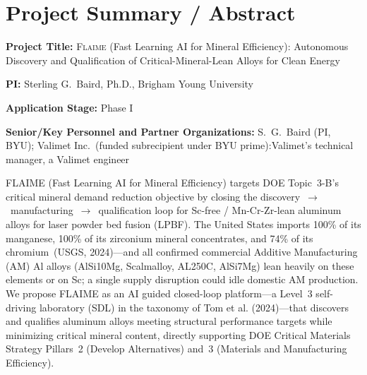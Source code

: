 \documentclass[11pt,letterpaper]{article}
\newif\ifsubmission
\newcommand{\guidance}[1]{\todo[inline,color=blue!20]{#1}}
\newcommand{\required}[1]{\todo[inline,color=red!25,bordercolor=red!60]{%
  \textbf{REQUIRED:} #1}}
\newcommand{\flaime}{\textsc{Flaime}}
\newcommand{\projecttitle}{\flaime{} (Fast Learning AI for Mineral
Efficiency): Autonomous Discovery and Qualification of
Critical-Mineral-Lean Alloys for Clean Energy}
\begin{document}
\ifsubmission\else  %
%
%
\section*{Project Summary / Abstract}
\label{sec:abstract}
\thispagestyle{empty}



\textbf{Project Title:} \projecttitle{}

\textbf{PI:} Sterling G.\ Baird, Ph.D., Brigham Young University

\textbf{Application Stage:} Phase I

\textbf{Senior/Key Personnel and Partner Organizations:}
S.\ G.\ Baird (PI, BYU);
Valimet Inc.\ (funded subrecipient under BYU prime):Valimet's technical manager, a Valimet engineer

\bigskip

FLAIME (Fast Learning AI for Mineral Efficiency) targets DOE Topic~3-B's
critical mineral demand reduction objective by closing the
discovery~$\to$~manufacturing~$\to$~qualification loop for
Sc-free / Mn-Cr-Zr-lean aluminum alloys for laser powder bed fusion
(LPBF). The United States imports 100\% of its manganese, 100\% of its
zirconium mineral concentrates, and 74\% of its chromium~(USGS, 2024)---and
all confirmed commercial Additive Manufacturing (AM) Al alloys (AlSi10Mg, Scalmalloy, AL250C,
AlSi7Mg) lean heavily on these elements or on Sc; a single supply disruption
could idle domestic AM production. We propose FLAIME as an AI guided
closed-loop platform---a Level~3 self-driving laboratory (SDL) in the
taxonomy of Tom et al. (2024)---that discovers and qualifies aluminum alloys
meeting structural performance targets while minimizing critical mineral
content, directly supporting DOE Critical Materials Strategy Pillars~2
(Develop Alternatives) and~3 (Materials and Manufacturing Efficiency).
\end{document}
